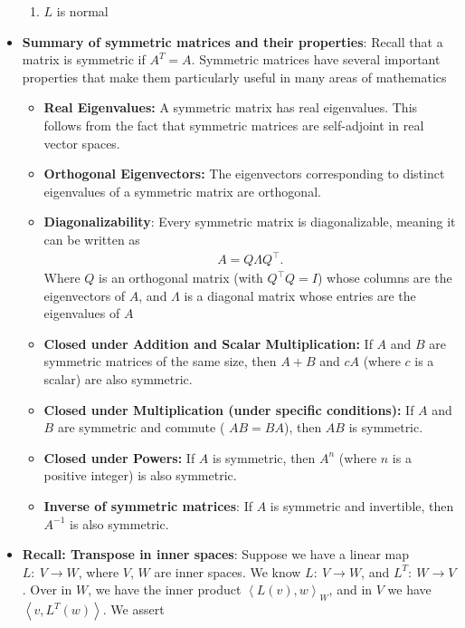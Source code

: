 \documentclass{report}
\begin{document}
\begin{itemize}
            \begin{enumerate}
                \item $L$ is normal
            \end{enumerate}       
        \item \textbf{Summary of symmetric matrices and their properties}: Recall that a matrix is symmetric if $A^{T} = A$. Symmetric matrices have several important properties that make them particularly useful in many areas of mathematics
            \begin{itemize}
                \item \textbf{Real Eigenvalues:} A symmetric matrix has real eigenvalues. This follows from the fact that symmetric matrices are self-adjoint in real vector spaces.
                \item \textbf{Orthogonal Eigenvectors:} The eigenvectors corresponding to distinct eigenvalues of a symmetric matrix are orthogonal.
                \item \textbf{Diagonalizability}: Every symmetric matrix is diagonalizable, meaning it can be written as
                    \begin{align*}
                        A = Q\Lambda Q^{\top}
                    .\end{align*}
                    Where $Q$ is an orthogonal matrix (with $Q^{\top}Q = I $) whose columns are the eigenvectors of $A$, and $\Lambda$ is a diagonal matrix whose entries are the eigenvalues of $A$
                \item \textbf{Closed under Addition and Scalar Multiplication:} If $A$ and $B$ are symmetric matrices of the same size, then $A+B$ and $cA$ (where $c$ is a scalar) are also symmetric. 
                \item \textbf{Closed under Multiplication (under specific conditions):} If $A$ and $B$ are symmetric and commute ( $AB=BA$), then $AB$ is symmetric.
                \item \textbf{Closed under Powers:} If 
                    $A$ is symmetric, then $A^{n}$ (where $n$ is a positive integer) is also symmetric.
                \item \textbf{Inverse of symmetric matrices}: If $A$ is symmetric and invertible, then  $A^{-1}$ is also symmetric.
            \end{itemize}
        \item \textbf{Recall: Transpose in inner spaces}: Suppose we have a linear map $L:\ V \to W$, where $V$, $W$ are inner spaces. We know $L:\ V \to W$, and $L^{T}:\  W \to V$. Over in $W$, we have the inner product $\left\langle L(v), w\right\rangle_{W}$, and in $V$ we have $\left\langle v, L^{T}(w) \right\rangle $. We assert

\end{itemize}
\end{document}
